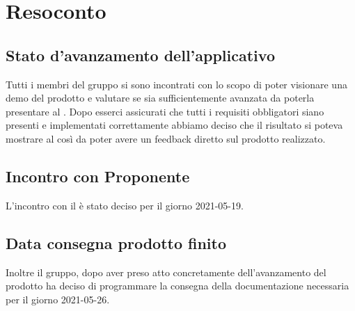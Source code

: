 \section{Resoconto}

\subsection{Stato d'avanzamento dell'applicativo}
Tutti i membri del gruppo si sono incontrati con lo scopo di poter visionare una demo del prodotto e valutare se sia sufficientemente avanzata da poterla presentare al \proponProg. 
Dopo esserci assicurati che tutti i requisiti obbligatori siano presenti e implementati correttamente abbiamo deciso che il risultato si poteva mostrare al \proponProg{} così da poter avere un feedback diretto sul prodotto realizzato.\\
\subsection{Incontro con Proponente}
L'incontro con il \proponProg{}  è stato deciso per il giorno 2021-05-19.\\
\subsection{Data consegna prodotto finito}
Inoltre il gruppo, dopo aver preso atto concretamente dell'avanzamento del prodotto ha deciso di programmare la consegna della documentazione necessaria per il giorno 2021-05-26.